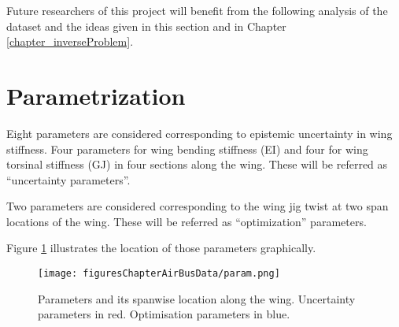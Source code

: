Future researchers of this project will benefit from the following analysis of the dataset and the ideas given in this section and in Chapter \ref{chapter_inverseProblem}.
 


\section{Parametrization} \label{sec_parametrization}

Eight parameters are considered corresponding to epistemic uncertainty in wing stiffness. Four parameters for wing bending stiffness (EI) and four for wing torsinal stiffness (GJ) in four sections along the wing. These will be referred as ``uncertainty parameters''. 

Two parameters are considered corresponding to the wing jig twist %
at two span locations of the wing. These will be referred as ``optimization'' parameters.

Figure \ref{fig_parameters} illustrates the location of those parameters graphically.


\begin{figure}[!htbp]
  \centering
    \texttt{[image: figuresChapterAirBusData/param.png]}
  \caption[Parameters and its spanwise location along the wing]%
{Parameters and its spanwise location along the wing. Uncertainty parameters in red. Optimisation parameters in blue.}
  \label{fig_parameters}
\end{figure}

